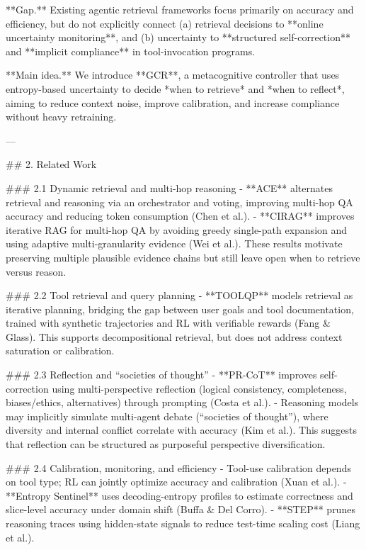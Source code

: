 **Gap.** Existing agentic retrieval frameworks focus primarily on accuracy and efficiency, but do not explicitly connect (a) retrieval decisions to **online uncertainty monitoring**, and (b) uncertainty to **structured self-correction** and **implicit compliance** in tool-invocation programs.  

**Main idea.** We introduce **GCR**, a metacognitive controller that uses entropy-based uncertainty to decide *when to retrieve* and *when to reflect*, aiming to reduce context noise, improve calibration, and increase compliance without heavy retraining.

---

## 2. Related Work  

### 2.1 Dynamic retrieval and multi-hop reasoning  
- **ACE** alternates retrieval and reasoning via an orchestrator and voting, improving multi-hop QA accuracy and reducing token consumption (Chen et al.).  
- **CIRAG** improves iterative RAG for multi-hop QA by avoiding greedy single-path expansion and using adaptive multi-granularity evidence (Wei et al.). These results motivate preserving multiple plausible evidence chains but still leave open when to retrieve versus reason.

### 2.2 Tool retrieval and query planning  
- **TOOLQP** models retrieval as iterative planning, bridging the gap between user goals and tool documentation, trained with synthetic trajectories and RL with verifiable rewards (Fang & Glass). This supports decompositional retrieval, but does not address context saturation or calibration.

### 2.3 Reflection and “societies of thought”  
- **PR-CoT** improves self-correction using multi-perspective reflection (logical consistency, completeness, biases/ethics, alternatives) through prompting (Costa et al.).  
- Reasoning models may implicitly simulate multi-agent debate (“societies of thought”), where diversity and internal conflict correlate with accuracy (Kim et al.). This suggests that reflection can be structured as purposeful perspective diversification.

### 2.4 Calibration, monitoring, and efficiency  
- Tool-use calibration depends on tool type; RL can jointly optimize accuracy and calibration (Xuan et al.).  
- **Entropy Sentinel** uses decoding-entropy profiles to estimate correctness and slice-level accuracy under domain shift (Buffa & Del Corro).  
- **STEP** prunes reasoning traces using hidden-state signals to reduce test-time scaling cost (Liang et al.).  

